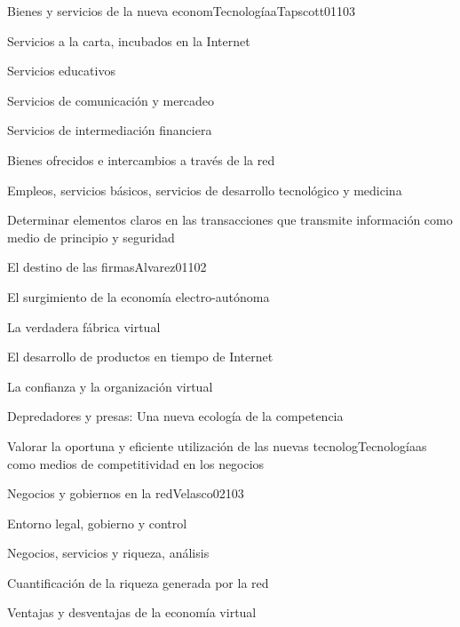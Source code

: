 \begin{syllabus}
\begin{unit}{Bienes y servicios de la nueva economTecnologíaa}{Tapscott01}{10}{3}
   \begin{topics}
      \item Servicios a la carta, incubados en la Internet
	\item Servicios educativos
	\item Servicios de comunicación y mercadeo
	\item Servicios de intermediación financiera
	\item Bienes ofrecidos e intercambios a través de la red
	\item Empleos, servicios básicos, servicios de desarrollo tecnológico y medicina
   \end{topics}

   \begin{unitgoals}
      \item Determinar elementos claros en las transacciones que transmite información como medio de principio y seguridad
   \end{unitgoals}
\end{unit}

\begin{unit}{El destino de las firmas}{Alvarez01}{10}{2}
   \begin{topics}
      \item El surgimiento de la economía electro-autónoma
	\item La verdadera fábrica virtual
	\item El desarrollo de productos en tiempo de Internet
	\item La confianza y la organización virtual
	\item Depredadores y presas: Una nueva ecología de la competencia
   \end{topics}

   \begin{unitgoals}
      \item Valorar la oportuna y eficiente utilización de las nuevas tecnologTecnologíaas como medios de competitividad en los negocios
   \end{unitgoals}
\end{unit}

\begin{unit}{Negocios y gobiernos en la red}{Velasco02}{10}{3}
   \begin{topics}
      \item Entorno legal, gobierno y control
	\item Negocios, servicios y riqueza, análisis
	\item Cuantificación de la riqueza generada por la red
	\item Ventajas y desventajas de la economía virtual
   \end{topics}


\end{unit}
\end{syllabus}
